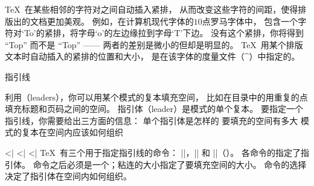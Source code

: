 {%
\TeX\ 在某些相邻的字符对之间自动插入紧排，
从而改变这些字符的间距，使得排版出的文档更加美观。
例如，在计算机现代字体的$10$点罗马字体中，
包含一个字符对`To'的紧排，将字母`o'的左边缘拉到字母`T'下边。
没有这个紧排，你将得到 \hbox{“T{o}p”} 而不是 “Top” ——%
两者的差别是微小的但却是明显的。
\TeX\ 用某个排版文本时自动插入的紧排的位置和大小，
是在该字体的度量文件（^{\tfmfile}）中指定的。

\endconcept


\concept 指引线

利用（leaders），你可以用某个模式的复本填充空间，
比如在目录中的用重复的点填充标题和页码之间的空间。
指引体（leader）是模式的单个复本。
要指定一个指引线，你需要给出三方面的信息：
\olist\compact
\li 单个指引体是怎样的
\li 要填充的空间有多大
\li 模式的复本在空间内应该如何组织
\endolist

\bix^^|\leaders|
\bix^^|\cleaders|
\bix^^|\xleaders|
\TeX\ 有三个用于指定指引线的命令：
|\leaders|，\hbox{|\cleaders|} 和 |\xleaders|（\xref\leaders ）。
各命令的指定了指引体。
命令之后必须是一个；粘连的大小指定了要填充空间的大小。
命令的选择决定了指引体在空间内如何组织。

}
